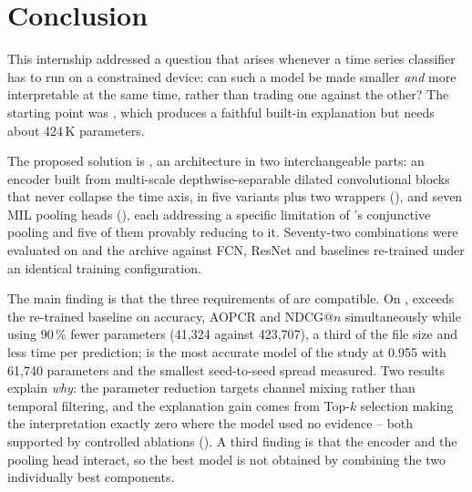 %

\section{Conclusion}
\label{sec:conclusion}

This internship addressed a question that arises whenever a time series classifier has to run on a
constrained device: can such a model be made smaller \emph{and} more interpretable at the same time,
rather than trading one against the other? The starting point was \millet{} \citep{early2024millet},
which produces a faithful built-in explanation but needs about 424\,K parameters.

The proposed solution is \seanet{}, an architecture in two interchangeable parts: an encoder built
from multi-scale depthwise-separable dilated convolutional blocks that never collapse the time axis,
in five variants plus two wrappers (), and seven MIL pooling heads
(), each addressing a specific limitation of \millet{}'s conjunctive
pooling and five of them provably reducing to it. Seventy-two combinations were evaluated on
\webtraffic{} and the \ucr{} archive against FCN, ResNet and \millet{} baselines re-trained under an
identical training configuration.

The main finding is that the three requirements of  are compatible. On
\webtraffic{}, \mbot{} exceeds the re-trained \millet{} baseline on accuracy, AOPCR and NDCG@$n$
simultaneously while using 90\,\% fewer parameters (41{,}324 against 423{,}707), a third of the file
size and less time per prediction; \mgat{} is the most accurate model of the study at 0.955 with
61{,}740 parameters and the smallest seed-to-seed spread measured. Two results explain \emph{why}:
the parameter reduction targets channel mixing rather than temporal filtering, and the explanation
gain comes from Top-$k$ selection making the interpretation exactly zero where the model used no
evidence -- both supported by controlled ablations (). A third finding is that
the encoder and the pooling head interact, so the best model is not obtained by combining the two
individually best components.


